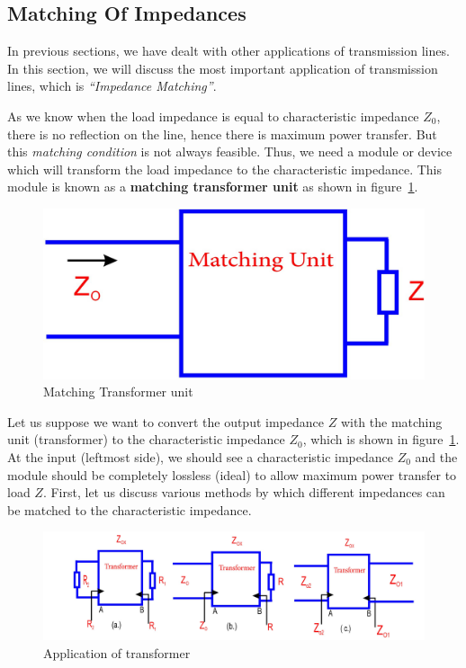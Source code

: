 \subsection{Matching Of Impedances}\label{lec:lec12}
In previous sections, we have dealt with other applications of transmission lines. In this section, we will discuss the most important application of transmission lines, which is \emph{\textquotedblleft Impedance Matching\textquotedblright}.

As we know when the load impedance is equal to characteristic impedance $Z_0$, there is no reflection on the line, hence there is maximum power transfer. But this \textit{matching condition} is not always feasible. Thus, we need a module or device which will transform the load impedance to the characteristic impedance. This module is known as a \textbf{matching transformer unit} as shown in figure~\ref{fig:fig7}.
\begin{figure}[h]
\centering
\includegraphics[width=0.7\linewidth]{./graphics/fig7}
\caption{Matching Transformer unit}
\label{fig:fig7}
\end{figure} 

Let us suppose we want to convert the output impedance $Z$ with the matching unit (transformer) to the characteristic impedance $Z_0$, which is shown in figure~\ref{fig:fig7}. At the input (leftmost side), we should see a characteristic impedance $ Z_0$ and the module should be completely lossless (ideal) to allow maximum power transfer to load $Z$. First, let us discuss various methods by which different impedances can be matched to the characteristic impedance.
\begin{figure}[h]
\centering
\includegraphics[width=1\linewidth]{./graphics/fig8}
\caption{Application of transformer}
\label{fig:fig8}
\end{figure}

